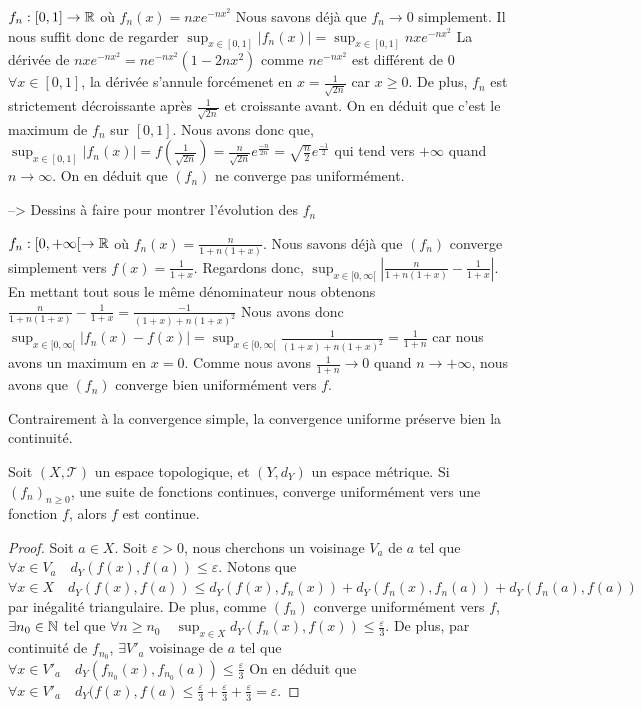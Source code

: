 \begin{exemple}
    $f_n : [0,1] \to \mathbb{R}$ où $f_n(x) = nxe^{-nx^2}$
    Nous savons déjà que $f_n \to 0$ simplement.
    Il nous suffit donc de regarder $\sup_{x\in [0,1]} |f_n(x)| =\sup_{x\in [0,1]} nxe^{-nx^2} $
    La dérivée de $nxe^{-nx^2} = ne^{-nx^2}(1-2nx^2)$ comme $ne^{-nx^2}$ est différent de $0$ $ \forall x \in [0,1]$, la dérivée s'annule forcémenet en $x = \frac{1}{\sqrt{2n}}$ car $x\ge 0$.
    De plus, $f_n$ est strictement décroissante après $\frac{1}{\sqrt{2n}}$ et croissante avant. On en déduit que c'est le maximum de $f_n$ sur $[0,1]$.
    Nous avons donc que, $\sup_{x\in [0,1]} |f_n(x)| = f(\frac{1}{\sqrt{2n}}) = \frac{n}{\sqrt{2n}}e^{\frac{-n}{2n}} = \sqrt{\frac{n}{2}}e^\frac{-1}{2}$ qui tend vers $+\infty$ quand $n \to \infty$.
    On en déduit que $(f_n)$ ne converge pas uniformément.

    --> Dessins à faire pour montrer l'évolution des $f_n$
\end{exemple}

\begin{exemple}
    $f_n : [0,+\infty[ \to \mathbb{R}$ où $f_n(x) = \frac{n}{1+n(1+x)}$.
    Nous savons déjà que $(f_n)$ converge simplement vers $f(x) = \frac{1}{1+x}$.
    Regardons donc, $\sup_{x\in [0,\infty[} | \frac{n}{1+n(1+x)} -\frac{1}{1+x}|$.
    En mettant tout sous le même dénominateur nous obtenons 
    $\frac{n}{1+n(1+x)} -\frac{1}{1+x} = \frac{-1}{(1+x) +n(1+x)^2}$
    Nous avons donc $\sup_{x\in [0,\infty[} |f_n(x) - f(x)| = \sup_{x\in [0,\infty[}\frac{1}{(1+x) +n(1+x)^2} = \frac{1}{1+n}$ car nous avons un maximum en $x = 0$.
    Comme nous avons $\frac{1}{1+n} \to 0$ quand $n\to +\infty$, nous avons que $(f_n)$ converge bien uniformément vers $f$.
    
\end{exemple}

Contrairement à la convergence simple, la convergence uniforme préserve bien la continuité.

\begin{proposition}
    Soit $(X,\mathcal{T})$ un espace topologique, et $(Y,d_Y)$ un espace métrique.
    Si $(f_n)_{n\ge0}$, une suite de fonctions continues, converge uniformément vers une fonction $f$, alors $f$ est continue. 
\end{proposition}

\begin{proof}
    Soit $a \in X$.
    Soit $\varepsilon > 0$, nous cherchons un voisinage $V_a$ de $a$ tel que $\forall x \in V_a \quad d_Y(f(x),f(a)) \le \varepsilon$.
    Notons que  $\forall x \in X \quad d_Y(f(x),f(a)) \le d_Y(f(x),f_n(x)) + d_Y(f_n(x),f_n(a)) + d_Y(f_n(a),f(a))$ par inégalité triangulaire.
    De plus, comme $(f_n)$ converge uniformément vers $f$, 
    $\exists n_0 \in \mathbb{N}$ tel que $\forall n \ge n_0 \quad \sup_{x\in X} d_Y(f_n(x),f(x)) \le \frac{\varepsilon}{3}$.
    De plus, par continuité de $f_{n_0}$, $\exists V'_a$ voisinage de $a$ tel que $\forall x \in V'_a  \quad d_Y(f_{n_0}(x),f_{n_0}(a)) \le \frac{\varepsilon}{3}$
    On en déduit que $\forall x \in V'_a \quad d_Y(f(x),f(a)\le \frac{\varepsilon}{3}+\frac{\varepsilon}{3}+\frac{\varepsilon}{3} = \varepsilon $. 
    
\end{proof}


